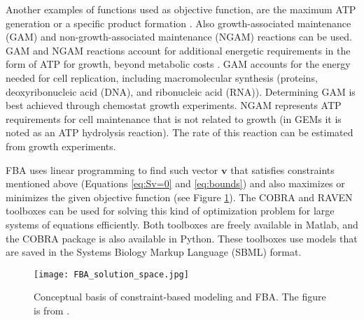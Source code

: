 Another examples of functions used as objective function, are the maximum ATP generation or a specific product formation \cite{Kerkhoven2014}. Also growth-associated maintenance (GAM) and non-growth-associated maintenance (NGAM) reactions can be used. 
GAM and NGAM reactions account for additional energetic requirements in the form of ATP for growth, beyond metabolic costs \cite{Feist2007}.
GAM accounts for the energy needed for cell replication, including macromolecular synthesis (proteins, deoxyribonucleic acid (DNA), and ribonucleic acid (RNA)). Determining GAM is best achieved through chemostat growth experiments. NGAM represents ATP requirements for cell maintenance that is not related to growth (in GEMs it is noted as an ATP hydrolysis reaction). The rate of this reaction can be estimated from growth experiments. \cite{Thiele2010}

FBA uses linear programming to find such vector $\mathbf{v}$ that satisfies constraints mentioned above (Equations \eqref{eq:Sv=0} and \eqref{eq:bounds}) and also maximizes or minimizes the given objective function (see Figure \ref{fig:Solution_space}). \cite{Orth2010}
The COBRA \cite{Becker2007} and RAVEN \cite{EduardKerkhoven2024} toolboxes can be used for solving this kind of optimization problem  for large systems of equations efficiently. Both toolboxes are freely available in Matlab, and the COBRA package is also available in Python. These toolboxes use models that are saved in the Systems Biology Markup Language (SBML) \cite{Hucka2003} format.
\begin{figure}[H]
    \texttt{[image: FBA\_solution\_space.jpg]}
    \caption{Conceptual basis of constraint-based modeling and FBA. The figure is from \cite{Orth2010}.}
    \label{fig:Solution_space}
\end{figure}


